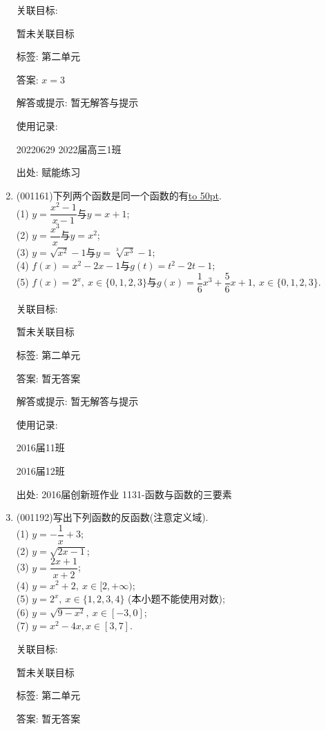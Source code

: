 \documentclass[10pt,a4paper]{article}
\newcommand{\blank}[1]{\underline{\hbox to #1pt{}}}
\begin{document}
\begin{enumerate}[1.]
关联目标:

暂未关联目标



标签: 第二单元

答案: $x=3$

解答或提示: 暂无解答与提示

使用记录:

20220629    2022届高三1班  	


出处: 赋能练习
\item { (001161)}下列两个函数是同一个函数的有\blank{50}.\\ 
(1) $y=\dfrac{x^2-1}{x-1}$与$y=x+1$;\\ 
(2) $y=\dfrac{x^3}{x}$与$y=x^2$;\\ 
(3) $y=\sqrt{x^2}-1$与$y=\sqrt[3]{x^3}-1$;\\ 
(4) $f(x)=x^2-2x-1$与$g(t)=t^2-2t-1$;\\ 
(5) $f(x)=2^x, \ x \in \{0,1,2,3\}$与$g(x)=\dfrac16x^3+\dfrac56x+1, \ x \in \{0,1,2,3\}$.


关联目标:

暂未关联目标



标签: 第二单元

答案: 暂无答案

解答或提示: 暂无解答与提示

使用记录:

2016届11班	

2016届12班	


出处: 2016届创新班作业	1131-函数与函数的三要素
\item { (001192)}写出下列函数的反函数(注意定义域).\\ 
(1) $y=-\dfrac{1}{x}+3$;\\ 
(2) $y=\sqrt{2x-1}$;\\ 
(3) $y=\dfrac{2x+1}{x+2}$;\\ 
(4) $y=x^2+2, \ x\in [2,+\infty)$;\\ 
(5) $y=2^x, \ x\in \{1,2,3,4\}$ (本小题不能使用对数);\\ 
(6) $y=\sqrt{9-x^2}, \ x\in [-3,0]$;\\ 
(7) $y=x^2-4x, x \in [3,7]$.


关联目标:

暂未关联目标



标签: 第二单元

答案: 暂无答案


\end{enumerate}
\end{document}
